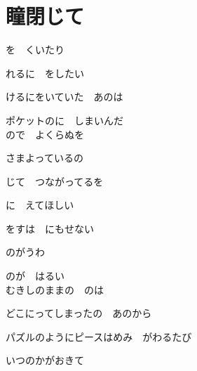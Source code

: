 \section{ 瞳閉じて}

\large{

を　くいたり

れるに　をしたい

けるにをいていた　あのは

ポケットのに　しまいんだ
\\

ので　よくらぬを

さまよっているの
\\


じて　つながってるを

に　えてほしい

をすは　にもせない

のがうわ

のが　はるい
\\

むきしのままの　のは

どこにってしまったの　あのから

パズルのようにピースはめみ　がわるたび

いつのかがおきて
\\

}
